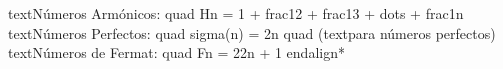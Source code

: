 {}\markdownRendererBackslash{}text\markdownRendererLeftBrace{}Números Armónicos:\markdownRendererRightBrace{} \markdownRendererAmpersand{} \markdownRendererBackslash{}quad H\markdownRendererUnderscore{}n = 1 + \markdownRendererBackslash{}frac\markdownRendererLeftBrace{}1\markdownRendererRightBrace{}\markdownRendererLeftBrace{}2\markdownRendererRightBrace{} + \markdownRendererBackslash{}frac\markdownRendererLeftBrace{}1\markdownRendererRightBrace{}\markdownRendererLeftBrace{}3\markdownRendererRightBrace{} + \markdownRendererBackslash{}dots + \markdownRendererBackslash{}frac\markdownRendererLeftBrace{}1\markdownRendererRightBrace{}\markdownRendererLeftBrace{}n\markdownRendererRightBrace{} \markdownRendererBackslash{}\markdownRendererBackslash{}\markdownRendererBackslash{}\markdownRendererHardLineBreak
{}\markdownRendererBackslash{}text\markdownRendererLeftBrace{}Números Perfectos:\markdownRendererRightBrace{} \markdownRendererAmpersand{} \markdownRendererBackslash{}quad \markdownRendererBackslash{}sigma(n) = 2n \markdownRendererBackslash{}quad (\markdownRendererBackslash{}text\markdownRendererLeftBrace{}para números perfectos\markdownRendererRightBrace{}) \markdownRendererBackslash{}\markdownRendererBackslash{}\markdownRendererSoftLineBreak
{}\markdownRendererBackslash{}text\markdownRendererLeftBrace{}Números de Fermat:\markdownRendererRightBrace{} \markdownRendererAmpersand{} \markdownRendererBackslash{}quad F\markdownRendererUnderscore{}n = 2\markdownRendererCircumflex{}\markdownRendererLeftBrace{}2\markdownRendererCircumflex{}n\markdownRendererRightBrace{} + 1\markdownRendererSoftLineBreak
{}\markdownRendererBackslash{}end\markdownRendererLeftBrace{}align*\markdownRendererRightBrace{}
\markdownRendererSectionEnd 
\markdownRendererSectionEnd \markdownRendererDocumentEnd
